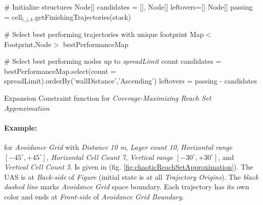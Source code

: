 \begin{algorithm}[H]
    
    \BlankLine
    \# Initialize structures\;
    Node[] candidates = [], Node[] leftovers=[]\;
    Node[] passing = cell$_{i,j,k}$.getFinishingTrajectories(stack)\;
    
    \BlankLine
    \# Select best performing trajectories with unique footprint\;
    Map$<$Footprint,Node$>$  bestPerformanceMap\;
    \For{Node test $\in$ passing}{
        wallDistance= test.minimalDistanceToWall(cell$_{i,j,k}$)]\;
        footPrint = test.getFootprint(lastCells = footprintLength)\;
        \eIf{bestPerformanceMap.contains(footPrint)}{
            old = bestPerformanceMap.getByKey(footprint)\;
            oldPerformance= old.minimalDistanceToWall(cell$_{i,j,k}$)\;
            \If{oldPerformance $>$ wallDistance}{
                bestPerformanceMap.setByKey(footprint,test)\;         
            }
        }{
            bestPerformanceMap.setByKey(footprint,test)\;
        }
    }
    
    \BlankLine
    \# Select best performing nodes up to \emph{spreadLimit} count\;
    candidates = bestPerformanceMap.select(count = spreadLimit).orderBy('wallDistance','Ascending')\;
    leftovers = passing - candidates\;
    
    
    \caption{Expansion Constraint function for \emph{Coverage-Maximizing Reach Set Approximation}}
    \label{alg:ExpansionConstraintFunctionForChaoticReachSet}
\end{algorithm}


\paragraph{Example:} for \emph{Avoidance Grid} with \emph{Distance 10 m}, \emph{Layer count 10}, \emph{Horizontal range $[-45^\circ,+45^\circ]$}, \emph{Horizontal Cell Count 7}, \emph{Vertical range $[-30^\circ,+30^\circ]$}, and \emph{Vertical Cell Count 5}. Is given in (fig. \ref{fig:chaoticReachSetApproximation}). The UAS is at \emph{Back-side} of \emph{Figure} (initial state is at all \emph{Trajectory Origins}). The \emph{black dashed line} marks \emph{Avoidance Grid} space boundary. Each trajectory has its own color and ends at \emph{Front-side} of \emph{Avoidance Grid Boundary}.


